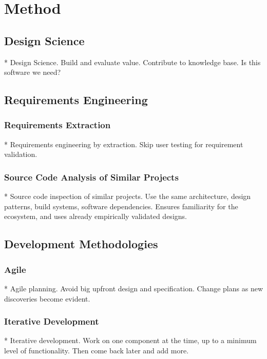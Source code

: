 \chapter{Method}\label{chap:method}



\section{Design Science}

* Design Science. Build and evaluate value. Contribute to knowledge base. Is this software we need?

\section{Requirements Engineering}

\subsection{Requirements Extraction}

* Requirements engineering by extraction. Skip user testing for requirement validation. 

\subsection{Source Code Analysis of Similar Projects}
* Source code inspection of similar projects. Use the same architecture, design patterns, build systems, software dependencies. Ensures familiarity for the ecosystem, and uses already empirically validated designs.

\section{Development Methodologies}

\subsection{Agile}

* Agile planning. Avoid big upfront design and specification. Change plans as new discoveries become evident.

\subsection{Iterative Development}
* Iterative development. Work on one component at the time, up to a minimum level of functionality. Then come back later and add more.


